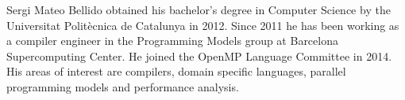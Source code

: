 \begin{IEEEbiography}{Sergi Mateo Bellido}
obtained his bachelor’s degree in Computer Science by the
Universitat Polit\`ecnica de Catalunya in 2012. Since 2011 he has been working as
a compiler engineer in the Programming Models group at Barcelona Supercomputing
Center. He joined the OpenMP Language Committee in 2014. His areas of interest
are compilers, domain specific languages, parallel programming models and
performance analysis.
\end{IEEEbiography}

